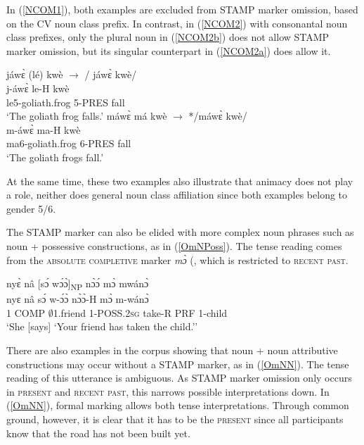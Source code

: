 In (\ref{NCOM1}), both examples are excluded from STAMP marker omission, based on the CV noun class prefix. In contrast, in (\ref{NCOM2}) with consonantal noun class prefixes,  only the plural noun in (\ref{NCOM2b}) does not allow STAMP marker omission, but its singular counterpart in (\ref{NCOM2a}) does allow it.

\begin{exe}
\ex\label{NCOM2}
\begin{xlist}
\ex \label{NCOM2a}
   \glll    jáwɛ̀ (lé) kwè  $\rightarrow$ / jáwɛ̀ kwè/ \\
             j-áwɛ̀ le-H kwè  \\
            le5-goliath.frog 5-PRES fall  \\
    \trans `The goliath frog falls.'
\ex\label{NCOM2b}
\glll   máwɛ̀ má kwè   $\rightarrow$ */máwɛ̀ kwè/ \\
          m-áwɛ̀ ma-H kwè   \\
            ma6-goliath.frog 6-PRES fall  \\
    \trans `The goliath frogs fall.' 
\end{xlist}
\end{exe}

\noindent At the same time, these two examples also illustrate that animacy does not play a role, neither does general noun class affiliation since both examples belong to gender 5/6.

The STAMP marker can also be elided with more complex noun phrases such as noun + possessive constructions, as in (\ref{OmNPoss}). The tense reading comes from the \textsc{absolute completive} marker {\itshape mɔ̀} (, which is restricted to \textsc{recent past}.

\begin{exe} 
\ex\label{OmNPoss}
  \glll nyɛ̀ nâ [sɔ́ wɔ́ɔ̀]\textsubscript{NP} nɔ̀ɔ́ mɔ̀ mwánɔ̀ \\
        nyɛ nâ sɔ́ w-ɔ́ɔ̀ nɔ̀ɔ̀-H mɔ̀ m-wánɔ̀ \\
      1 COMP $\emptyset$1.friend 1-POSS.2\textsc{sg} take-R PRF 1-child   \\
    \trans `She [says] `Your friend has taken the child.''
\end{exe}

There are also examples in the corpus showing that noun + noun attributive constructions may occur without a STAMP marker, as in (\ref{OmNN}). The tense reading of this utterance is ambiguous. As STAMP marker omission only occurs in \textsc{present} and \textsc{recent past}, this narrows possible interpretations down. In (\ref{OmNN}), formal marking allows both tense interpretations. Through common ground, however, it is clear that it has to be the \textsc{present} since all participants know that the road has not been built yet.

